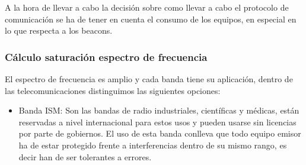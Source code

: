 \documentclass[a4paper ,12pt, onecolumn]{article}
\begin{document}
            A la hora de llevar a cabo la decisión sobre como llevar a cabo el protocolo de comunicación se ha de tener en cuenta 
            el consumo de los equipos, en especial en lo que respecta a los beacons.

        \subsubsection{Cálculo saturación espectro de frecuencia}
            El espectro de frecuencia es amplio y cada banda tiene su aplicación, dentro de las telecomunicaciones
            distinguimos las siguientes opciones:
            \begin{itemize}
                \item Banda ISM: Son las bandas de radio industriales, científicas y médicas, están reservadas a 
                nivel internacional para estos usos y pueden usarse sin licencias por parte de gobiernos. El uso de esta
                banda conlleva que todo equipo emisor ha de estar protegido frente a interferencias dentro de su mismo 
                rango, es decir han de ser tolerantes a errores.
    

\end{itemize}
\end{document}
